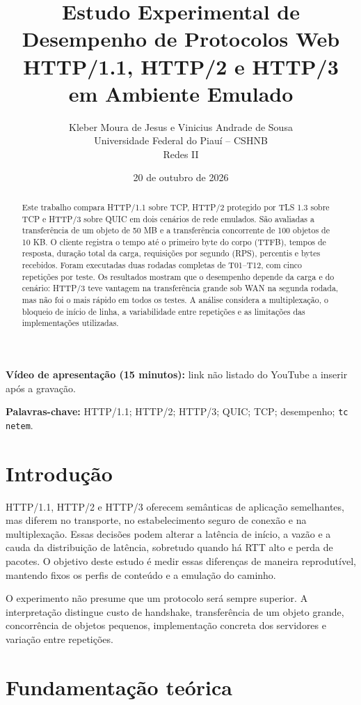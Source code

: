 \documentclass[12pt,a4paper]{article}
\title{
  \textbf{Estudo Experimental de Desempenho de Protocolos Web}\\
  \large HTTP/1.1, HTTP/2 e HTTP/3 em Ambiente Emulado
}
\author{
  Kleber Moura de Jesus e Vinicius Andrade de Sousa\\
  Universidade Federal do Piauí -- CSHNB\\
  Redes II
}
\date{20 de outubro de 2026}
\begin{document}
\maketitle

\begin{center}
\textbf{Vídeo de apresentação (15 minutos):} link não listado do YouTube a inserir após a gravação.
\end{center}

\begin{abstract}
Este trabalho compara HTTP/1.1 sobre TCP, HTTP/2 protegido por TLS 1.3 sobre TCP e HTTP/3
sobre QUIC em dois cenários de rede emulados. São avaliadas a transferência de um objeto de
50 MB e a transferência concorrente de 100 objetos de 10 KB. O cliente registra o tempo até
o primeiro byte do corpo (TTFB), tempos de resposta, duração total da carga, requisições por
segundo (RPS), percentis e bytes recebidos. Foram executadas duas rodadas completas de
T01--T12, com cinco repetições por teste. Os resultados mostram que o desempenho depende
da carga e do cenário: HTTP/3 teve vantagem na transferência grande sob WAN na segunda
rodada, mas não foi o mais rápido em todos os testes. A análise considera a multiplexação,
o bloqueio de início de linha, a variabilidade entre repetições e as limitações das
implementações utilizadas.
\end{abstract}

\noindent\textbf{Palavras-chave:} HTTP/1.1; HTTP/2; HTTP/3; QUIC; TCP; desempenho; \texttt{tc netem}.

\section{Introdução}

HTTP/1.1, HTTP/2 e HTTP/3 oferecem semânticas de aplicação semelhantes, mas diferem no
transporte, no estabelecimento seguro de conexão e na multiplexação. Essas decisões podem
alterar a latência de início, a vazão e a cauda da distribuição de latência, sobretudo quando
há RTT alto e perda de pacotes. O objetivo deste estudo é medir essas diferenças de maneira
reprodutível, mantendo fixos os perfis de conteúdo e a emulação do caminho.

O experimento não presume que um protocolo será sempre superior. A interpretação distingue
custo de handshake, transferência de um objeto grande, concorrência de objetos pequenos,
implementação concreta dos servidores e variação entre repetições.

\section{Fundamentação teórica}
\end{document}
